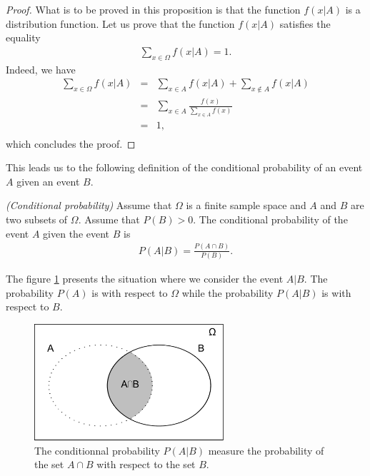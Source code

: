\begin{proof}
What is to be proved in this proposition is that the function 
$f(x|A)$ is a distribution function.
Let us prove that the function $f(x|A)$ satisfies 
the equality 
\begin{eqnarray}
\label{introstats-eq-conddistribproof1}
\sum_{x\in \Omega} f(x|A) = 1.
\end{eqnarray}
Indeed, we have 
\begin{eqnarray}
\sum_{x\in \Omega} f(x|A) &=& \sum_{x\in A} f(x|A) + \sum_{x\notin A} f(x|A)\\
&=&\sum_{x\in A} \frac{f(x)}{\sum_{x\in A} f(x)}\\
&=&1,\\
\end{eqnarray}
which concludes the proof.
\end{proof}

This leads us to the following definition of the 
conditional probability of an event $A$ given an event $B$.

\begin{proposition}
\emph{(Conditional probability)}
\label{introstats-condproba}
Assume that $\Omega$ is a finite sample space and $A$ and $B$ are two 
subsets of $\Omega$. Assume that $P(B)>0$.
The conditional probability of the event $A$ given the event $B$ is  
\begin{eqnarray}
\label{introstats-eq-pabcond}
P(A|B) = \frac{P(A\cap B)}{P(B)}.
\end{eqnarray}
\end{proposition}

The figure \ref{fig-introstats-setcondproba} presents the situation where 
we consider the event $A|B$.
The probability $P(A)$ is with respect to $\Omega$ while the 
probability $P(A|B)$ is with respect to $B$.

\begin{figure}
\begin{center}
\includegraphics[width=7cm]{introdiscreteprobas/sets-condproba.pdf}
\end{center}
\caption{The conditionnal probability $P(A|B)$ measure the probability of  
the set $A\cap B$ with respect to the set $B$.}
\label{fig-introstats-setcondproba}
\end{figure}

